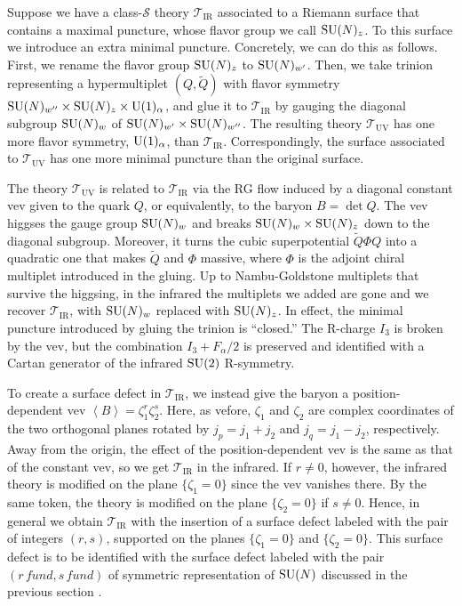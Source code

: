 Suppose we have a class-$\mathcal{S}$ theory $\mathcal{T}_{\mathrm{IR}}$
associated to a Riemann surface that contains a maximal puncture,
whose flavor group we call $\mathrm{SU}(N)_{z}$. To this surface we introduce
an extra minimal puncture. Concretely, we can do this as follows.
First, we rename the flavor group $\mathrm{SU}(N)_{z}$ to $\mathrm{SU}(N)_{w'}$. Then,
we take trinion representing a hypermultiplet $(Q,\tilde{Q})$ with
flavor symmetry $\mathrm{SU}(N)_{w''} \times \mathrm{SU}(N)_{z}\times \mathrm{U}(1)_{\alpha}$,
and glue it to $\mathcal{T}_{\mathrm{IR}}$ by gauging the diagonal
subgroup $\mathrm{SU}(N)_{w}$ of $\mathrm{SU}(N)_{w'}\times \mathrm{SU}(N)_{w''}$. The resulting
theory $\mathcal{T}_{\mathrm{UV}}$ has one more flavor symmetry,
$\mathrm{U}(1)_{\alpha}$, than $\mathcal{T}_{\mathrm{IR}}$. Correspondingly,
the surface associated to $\mathcal{T}_{\mathrm{UV}}$ has one more
minimal puncture than the original surface.

The theory $\mathcal{T}_{\mathrm{UV}}$ is related to $\mathcal{T}_{\mathrm{IR}}$
via the RG flow induced by a diagonal constant vev given to the quark
$Q$, or equivalently, to the baryon $B=\det Q$. The vev higgses
the gauge group $\mathrm{SU}(N)_{w}$ and breaks $\mathrm{SU}(N)_{w} \times \mathrm{SU}(N)_{z}$
down to the diagonal subgroup. Moreover, it turns the cubic superpotential
$\tilde{Q} \Phi Q$ into a quadratic one that makes $\tilde{Q}$ and
$\Phi$ massive, where $\Phi$ is the adjoint chiral multiplet introduced
in the gluing. Up to Nambu-Goldstone multiplets that survive the higgsing,
in the infrared the multiplets we added are gone and we recover $\mathcal{T}_{\mathrm{IR}}$,
with $\mathrm{SU}(N)_{w}$ replaced with $\mathrm{SU}(N)_{z}$. In effect, the minimal
puncture introduced by gluing the trinion is ``closed.'' The R-charge
$I_{3}$ is broken by the vev, but the combination $I_{3}+F_{\alpha}/2$
is preserved and identified with a Cartan generator of the infrared
$\mathrm{SU}(2)$ R-symmetry.

To create a surface defect in $\mathcal{T}_{\mathrm{IR}}$, we instead
give the baryon a position-dependent vev $\left\langle B\right\rangle = \zeta_{1}^{r}\zeta_{2}^{s}$.
Here, as vefore, $\zeta_{1}$ and $\zeta_{2}$ are complex coordinates
of the two orthogonal planes rotated by $j_{p}=j_{1}+j_{2}$ and $j_{q}=j_{1}-j_{2}$,
respectively. Away from the origin, the effect of the position-dependent
vev is the same as that of the constant vev, so we get $\mathcal{T}_{\mathrm{IR}}$
in the infrared. If $r\neq0$, however, the infrared theory is modified
on the plane $\{\zeta_{1}=0\}$ since the vev vanishes there. By the
same token, the theory is modified on the plane $\{\zeta_{2}=0\}$
if $s\neq0$. Hence, in general we obtain $\mathcal{T}_{\mathrm{IR}}$
with the insertion of a surface defect labeled with the pair of integers
$(r,s)$, supported on the planes $\{\zeta_{1}=0\}$ and $\{\zeta_{2}=0\}$.
This surface defect is to be identified with the surface defect labeled
with the pair $(r\,fund,s\,fund)$ of symmetric representation of
$\mathrm{SU}(N)$ discussed in the previous section \cite{Gadde:2013dda}. 

